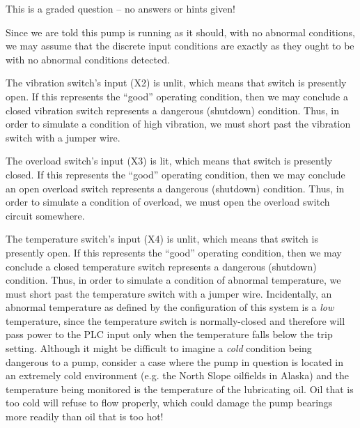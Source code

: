 \eject






This is a graded question -- no answers or hints given!







Since we are told this pump is running as it should, with no abnormal conditions, we may assume that the discrete input conditions are exactly as they ought to be with no abnormal conditions detected.

\vskip 10pt

The vibration switch's input (X2) is unlit, which means that switch is presently open.  If this represents the ``good'' operating condition, then we may conclude a closed vibration switch represents a dangerous (shutdown) condition.  Thus, in order to simulate a condition of high vibration, we must short past the vibration switch with a jumper wire.

\vskip 10pt

The overload switch's input (X3) is lit, which means that switch is presently closed.  If this represents the ``good'' operating condition, then we may conclude an open overload switch represents a dangerous (shutdown) condition.  Thus, in order to simulate a condition of overload, we must open the overload switch circuit somewhere.

\vskip 10pt

The temperature switch's input (X4) is unlit, which means that switch is presently open.  If this represents the ``good'' operating condition, then we may conclude a closed temperature switch represents a dangerous (shutdown) condition.  Thus, in order to simulate a condition of abnormal temperature, we must short past the temperature switch with a jumper wire.  Incidentally, an abnormal temperature as defined by the configuration of this system is a {\it low} temperature, since the temperature switch is normally-closed and therefore will pass power to the PLC input only when the temperature falls below the trip setting.  Although it might be difficult to imagine a {\it cold} condition being dangerous to a pump, consider a case where the pump in question is located in an extremely cold environment (e.g. the North Slope oilfields in Alaska) and the temperature being monitored is the temperature of the lubricating oil.  Oil that is too cold will refuse to flow properly, which could damage the pump bearings more readily than oil that is too hot!





